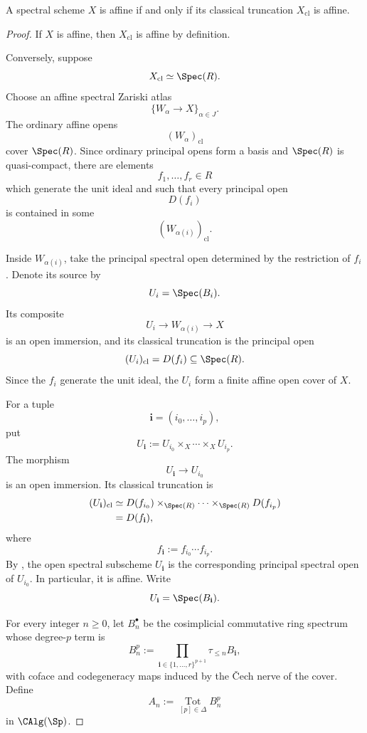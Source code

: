 \begin{theorem}
\label{thm:affineness-detected-classically}
A spectral scheme $X$ is affine if and only if its classical truncation
$X_{\mathrm{cl}}$ is affine.
\end{theorem}
\begin{proof}
If \(X\) is affine, then \(X_{\mathrm{cl}}\) is affine by definition.

Conversely, suppose
\[
    X_{\mathrm{cl}}
    \simeq
    \Spec(R).
\]
Choose an affine spectral Zariski atlas
\[
    \{W_\alpha\to X\}_{\alpha\in J}.
\]
The ordinary affine opens
\[
    (W_\alpha)_{\mathrm{cl}}
\]
cover \(\Spec(R)\). Since ordinary principal opens form a basis and
\(\Spec(R)\) is quasi-compact, there are elements
\[
    f_1,\ldots,f_r
    \in
    R
\]
which generate the unit ideal and such that every principal open
\[
    D(f_i)
\]
is contained in some
\[
    (W_{\alpha(i)})_{\mathrm{cl}}.
\]

Inside \(W_{\alpha(i)}\), take the principal spectral open determined by
the restriction of \(f_i\). Denote its source by
\[
    U_i
    =
    \Spec(B_i).
\]
Its composite
\[
    U_i
    \longrightarrow
    W_{\alpha(i)}
    \longrightarrow
    X
\]
is an open immersion, and its classical truncation is the principal open
\[
    (U_i)_{\mathrm{cl}}
    =
    D(f_i)
    \subseteq
    \Spec(R).
\]
Since the \(f_i\) generate the unit ideal, the \(U_i\) form a finite
affine open cover of \(X\).

For a tuple
\[
    \mathbf i
    =
    (i_0,\ldots,i_p),
\]
put
\[
    U_{\mathbf i}
    :=
    U_{i_0}
    \times_X
    \cdots
    \times_X
    U_{i_p}.
\]
The morphism
\[
    U_{\mathbf i}
    \longrightarrow
    U_{i_0}
\]
is an open immersion. Its classical truncation is
\[
\begin{aligned}
    (U_{\mathbf i})_{\mathrm{cl}}
    &\simeq
    D(f_{i_0})
    \times_{\Spec(R)}
    \cdots
    \times_{\Spec(R)}
    D(f_{i_p})
    \\
    &=
    D(f_{\mathbf i}),
\end{aligned}
\]
where
\[
    f_{\mathbf i}
    :=
    f_{i_0}\cdots f_{i_p}.
\]
By
,
the open spectral subscheme \(U_{\mathbf i}\) is the corresponding
principal spectral open of \(U_{i_0}\). In particular, it is affine.
Write
\[
    U_{\mathbf i}
    =
    \Spec(B_{\mathbf i}).
\]

For every integer \(n\geq0\), let \(B_n^\bullet\) be the cosimplicial
commutative ring spectrum whose degree-\(p\) term is
\[
    B_n^p
    :=
    \prod_{\mathbf i\in\{1,\ldots,r\}^{p+1}}
    \tau_{\leq n}B_{\mathbf i},
\]
with coface and codegeneracy maps induced by the \v{C}ech nerve of the
cover. Define
\[
    A_n
    :=
    \operatorname*{Tot}_{[p]\in\Delta}
    B_n^p
\]
in \(\CAlg(\Sp)\).


\end{proof}
